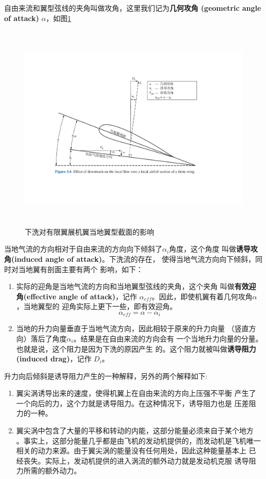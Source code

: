 自由来流和翼型弦线的夹角叫做攻角，这里我们记为{\bfseries 几何攻角
(geometric angle of attack)}
$\alpha$，如图\ref{fig:effective_attack}
\begin{figure}[!ht]
  \centering
  \includegraphics[height=10cm]{./aerodynamics/effective_attack.pdf}
  \caption{下洗对有限翼展机翼当地翼型截面的影响}
  \label{fig:effective_attack}
\end{figure}
当地气流的方向相对于自由来流的方向向下倾斜了$\alpha_i$角度，这个角度
叫做{\bfseries 诱导攻角(induced angle of attack)}。下洗流的存在，
使得当地气流方向向下倾斜，同时对当地翼有剖面主要有两个
影响，如下：
\begin{enumerate}
  \item 实际的迎角是当地气流的方向和当地翼型弦线的夹角，这个夹角
    叫做{\bfseries 有效迎角(effective angle of attack)}，记作
    $\alpha_{eff}$。因此，即使机翼有着几何攻角$\alpha$，当地翼型的
    迎角实际上更下一些，即有效迎角。
    \[
      \alpha_{eff}=\alpha-\alpha_i
    \]
  \item 当地的升力向量垂直于当地气流方向，因此相较于原来的升力向量
    （竖直方向）落后了角度$\alpha_i$。结果是在自由来流的方向会有
    一个当地升力向量的分量。也就是说，这个阻力是因为下洗的原因产生
    的。这个阻力就被叫做{\bfseries 诱导阻力(induced drag)}，记作
    $D_i$。
\end{enumerate}

升力向后倾斜是诱导阻力产生的一种解释，另外的两个解释如下:
\begin{enumerate}
  \item 翼尖涡诱导出来的速度，使得机翼上在自由来流的方向上压强不平衡
    产生了一个向后的力，这个力就是诱导阻力。在这种情况下，诱导阻力也是
    压差阻力的一种。
  \item 翼尖涡中包含了大量的平移和转动的内能，这部分能量必须来自于某个地方
    。事实上，这部分能量几乎都是由飞机的发动机提供的，而发动机是飞机唯一
    相关的动力来源。由于翼尖涡的能量没有任何用处，因此这种能量基本上
    已经丧失。实际上，发动机提供的进入涡流的额外动力就是发动机克服
    诱导阻力所需的额外动力。
\end{enumerate}

